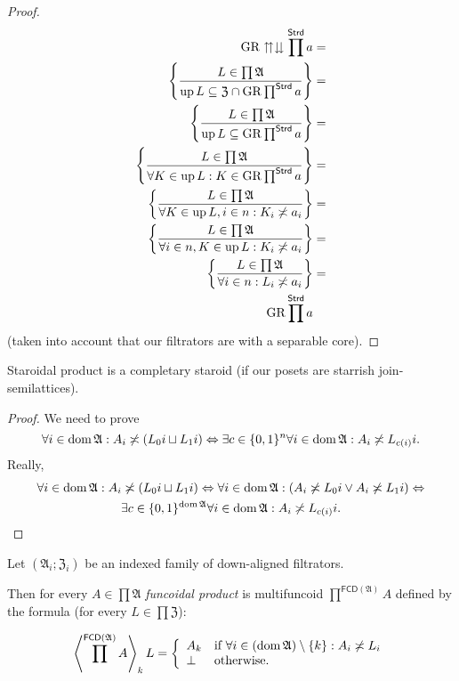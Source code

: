 \begin{proof}
~
\begin{align*}
\operatorname{GR}\upuparrows\downdownarrows\prod^{\mathsf{Strd}}a & =\\
\left\{ \frac{L\in\prod\mathfrak{A}}{\operatorname{up} L\subseteq\mathfrak{Z}\cap\operatorname{GR}\prod^{\mathsf{Strd}}a}\right\} & =\\
\left\{ \frac{L\in\prod\mathfrak{A}}{\operatorname{up} L\subseteq\operatorname{GR}\prod^{\mathsf{Strd}}a}\right\} & =\\
\left\{ \frac{L\in\prod\mathfrak{A}}{\forall K\in\operatorname{up} L:K\in\operatorname{GR}\prod^{\mathsf{Strd}}a}\right\} & =\\
\left\{ \frac{L\in\prod\mathfrak{A}}{\forall K\in\operatorname{up} L,i\in n:K_{i}\not\asymp a_{i}}\right\} & =\\
\left\{ \frac{L\in\prod\mathfrak{A}}{\forall i\in n,K\in\operatorname{up} L:K_{i}\not\asymp a_{i}}\right\} & =\\
\left\{ \frac{L\in\prod\mathfrak{A}}{\forall i\in n:L_{i}\not\asymp a_{i}}\right\} & =\\
\operatorname{GR}\prod^{\mathsf{Strd}}a
\end{align*}
(taken into account that our filtrators are with a separable core).\end{proof}
\begin{thm}
Staroidal product is a completary staroid (if our posets are starrish
join-semilattices).\end{thm}
\begin{proof}
We need to prove 
\[
\forall i\in\operatorname{dom}\mathfrak{A}:A_{i}\not\asymp(L_{0}i\sqcup L_{1}i)\Leftrightarrow\exists c\in\{0,1\}^{n}\forall i\in\operatorname{dom}\mathfrak{A}:A_{i}\not\asymp L_{c(i)}i.
\]
Really, 
\begin{multline*}
\forall i\in\operatorname{dom}\mathfrak{A}:A_{i}\not\asymp(L_{0}i\sqcup L_{1}i)\Leftrightarrow\forall i\in\operatorname{dom}\mathfrak{A}:(A_{i}\not\asymp L_{0}i\vee A_{i}\not\asymp L_{1}i)\Leftrightarrow\\
\exists c\in\{0,1\}^{\operatorname{dom}\mathfrak{A}}\forall i\in\operatorname{dom}\mathfrak{A}:A_{i}\not\asymp L_{c(i)}i.
\end{multline*}
\end{proof}
\begin{defn}
Let $(\mathfrak{A}_{i};\mathfrak{Z}_{i})$
be an indexed family of down-aligned filtrators.

Then for every $A\in\prod\mathfrak{A}$ \emph{funcoidal product} is
multifuncoid $\prod^{\mathsf{FCD}(\mathfrak{A})}A$ defined by the
formula (for every $L\in\prod\mathfrak{Z}$):

\[
\left\langle \prod^{\mathsf{FCD}(\mathfrak{A})}A\right\rangle_{k}L=\left\{ \begin{array}{ll}
A_{k} & \text{if }\forall i\in(\operatorname{dom}\mathfrak{A})\setminus\{k\}:A_{i}\not\asymp L_{i}\\
\bot & \text{otherwise}.
\end{array}\right.
\]
\end{defn}
